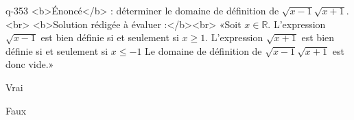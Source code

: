 \begin{truefalse}{q-353}
<b>Énoncé</b> : déterminer le domaine de définition de $\sqrt{x-1}\sqrt{x+1}$.<br> <b>Solution rédigée à évaluer :</b><br>  «Soit $x\in\mathbb{R}$.  L'expression $\sqrt{x-1}$ est bien définie si et seulement si $x\geq 1$. L'expression $\sqrt{x+1}$ est bien définie si et seulement si $x\leq -1$ Le domaine de définition de $\sqrt{x-1}\sqrt{x+1}$ est donc vide.»
\item Vrai
\item* Faux
\end{truefalse}

